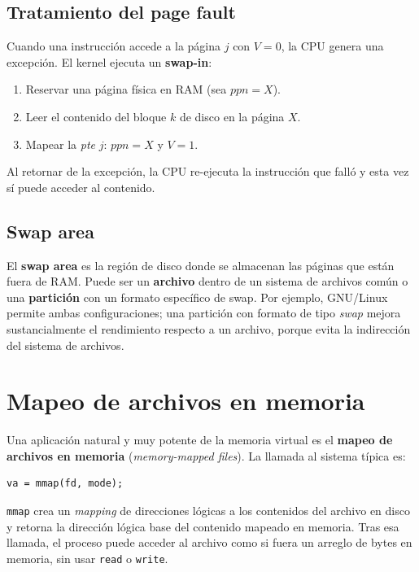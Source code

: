 \documentclass[11pt,a4paper]{article}
\begin{document}
\subsection{Tratamiento del page fault}

Cuando una instrucción accede a la página $j$ con $V=0$, la CPU genera
una excepción. El kernel ejecuta un \textbf{swap-in}:

\begin{enumerate}[leftmargin=*]
    \item Reservar una página física en RAM (sea $\textit{ppn} = X$).
    \item Leer el contenido del bloque $k$ de disco en la página $X$.
    \item Mapear la \emph{pte} $j$: $\textit{ppn} = X$ y $V = 1$.
\end{enumerate}

Al retornar de la excepción, la CPU re-ejecuta la instrucción que falló
y esta vez sí puede acceder al contenido.

\subsection{Swap area}

El \textbf{swap area} es la región de disco donde se almacenan las
páginas que están fuera de RAM. Puede ser un \textbf{archivo} dentro de
un sistema de archivos común o una \textbf{partición} con un formato
específico de swap. Por ejemplo, GNU/Linux permite ambas configuraciones;
una partición con formato de tipo \emph{swap} mejora sustancialmente el
rendimiento respecto a un archivo, porque evita la indirección del
sistema de archivos.

\section{Mapeo de archivos en memoria}

Una aplicación natural y muy potente de la memoria virtual es el
\textbf{mapeo de archivos en memoria} (\emph{memory-mapped files}). La
llamada al sistema típica es:

\begin{lstlisting}[style=cstyle]
va = mmap(fd, mode);
\end{lstlisting}

\begin{definicion}
\texttt{mmap} crea un \emph{mapping} de direcciones lógicas a los
contenidos del archivo en disco y retorna la dirección lógica base del
contenido mapeado en memoria. Tras esa llamada, el proceso puede
acceder al archivo como si fuera un arreglo de bytes en memoria, sin
usar \texttt{read} o \texttt{write}.
\end{definicion}
\end{document}
